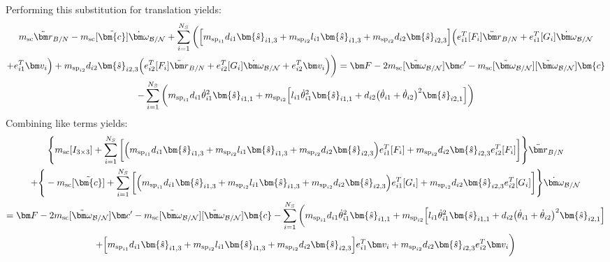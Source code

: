 Performing this substitution for translation yields:
\begin{multline}
	m_\text{sc} \ddot{\bm r}_{B/N} -m_\text{sc} [\tilde{\bm{c}}] \dot{\bm\omega}_{\cal B/N} +  \sum_{i=1}^{N_{S}}\bigg(\Big[m_{\text{sp}_{i1}}d_{i1} \bm{\hat{s}}_{i1,3} +m_{\text{sp}_{i2}}l_{i1} \bm{\hat{s}}_{i1,3}+m_{\text{sp}_{i2}} d_{i2}\bm{\hat{s}}_{i2,3}\Big]\Big(e_{i1}^T[F_i] \ddot{\bm r}_{B/N} + e_{i1}^T[G_i]\dot{\bm\omega}_{\cal B/N} \\
	+ e_{i1}^T\bm v_i\Big) +m_{\text{sp}_{i2}} d_{i2} \bm{\hat{s}}_{i2,3}\Big(e_{i2}^T[F_i] \ddot{\bm r}_{B/N} + e_{i2}^T[G_i]\dot{\bm\omega}_{\cal B/N} + e_{i2}^T\bm v_i\Big)\bigg)
	= \bm F - 2m_\text{sc} [\tilde{\bm\omega}_{\cal B/N}] \bm c'- m_\text{sc} [\tilde{\bm\omega}_{\cal B/N}][\tilde{\bm\omega}_{\cal B/N}]\bm{c}\\
	-\sum_{i=1}^{N_{S}}\bigg(m_{\text{sp}_{i1}}d_{i1} \dot{\theta}_{i1}^2 \bm{\hat{s}}_{i1,1} +m_{\text{sp}_{i2}}\Big[l_{i1} \dot{\theta}_{i1}^2 \bm{\hat{s}}_{i1,1} + d_{i2}\big(\dot{\theta}_{i1} + \dot{\theta}_{i2}\big)^2\bm{\hat{s}}_{i2,1}\Big]\bigg)
	\label{eq:Rbddot5}
\end{multline}
Combining like terms yields:
\begin{multline}
	\Bigg \lbrace m_\text{sc} [I_{3\times 3}] +  \sum_{i=1}^{N_{S}}\bigg[\Big(m_{\text{sp}_{i1}}d_{i1} \bm{\hat{s}}_{i1,3} +m_{\text{sp}_{i2}}l_{i1} \bm{\hat{s}}_{i1,3}+m_{\text{sp}_{i2}} d_{i2}\bm{\hat{s}}_{i2,3}\Big)e_{i1}^T[F_i] +m_{\text{sp}_{i2}} d_{i2} \bm{\hat{s}}_{i2,3}e_{i2}^T[F_i] \bigg] \Bigg \rbrace \ddot{\bm r}_{B/N} \\
	+\Bigg \lbrace-m_\text{sc} [\tilde{\bm{c}}] +  \sum_{i=1}^{N_{S}}\bigg[\Big(m_{\text{sp}_{i1}}d_{i1} \bm{\hat{s}}_{i1,3} +m_{\text{sp}_{i2}}l_{i1} \bm{\hat{s}}_{i1,3}+m_{\text{sp}_{i2}} d_{i2}\bm{\hat{s}}_{i2,3}\Big) e_{i1}^T[G_i] +m_{\text{sp}_{i2}} d_{i2} \bm{\hat{s}}_{i2,3} e_{i2}^T[G_i]\bigg] \Bigg \rbrace \dot{\bm\omega}_{\cal B/N} \\
	= \bm F - 2m_\text{sc} [\tilde{\bm\omega}_{\cal B/N}] \bm c'- m_\text{sc} [\tilde{\bm\omega}_{\cal B/N}][\tilde{\bm\omega}_{\cal B/N}]\bm{c}
	-\sum_{i=1}^{N_{S}}\bigg(m_{\text{sp}_{i1}}d_{i1} \dot{\theta}_{i1}^2 \bm{\hat{s}}_{i1,1} +m_{\text{sp}_{i2}}\Big[l_{i1} \dot{\theta}_{i1}^2 \bm{\hat{s}}_{i1,1} + d_{i2}\big(\dot{\theta}_{i1} + \dot{\theta}_{i2}\big)^2\bm{\hat{s}}_{i2,1}\Big]\\
	+\Big[m_{\text{sp}_{i1}}d_{i1} \bm{\hat{s}}_{i1,3} +m_{\text{sp}_{i2}}l_{i1} \bm{\hat{s}}_{i1,3}+m_{\text{sp}_{i2}} d_{i2}\bm{\hat{s}}_{i2,3}\Big]e_{i1}^T\bm v_i
	+m_{\text{sp}_{i2}} d_{i2} \bm{\hat{s}}_{i2,3}e_{i2}^T\bm v_i \bigg)
	\label{eq:Rbddot6}
\end{multline}
